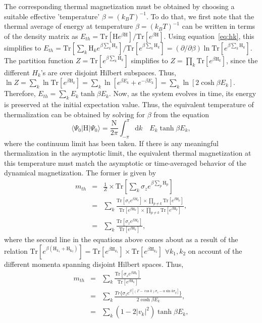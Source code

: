 \documentclass[a4paper,10pt]{article}
\begin{document}
The corresponding thermal magnetization must be obtained by choosing a suitable effective 'temperature' $\beta=(k_BT)^{-1}$. To do that, we first note that the thermal average of energy at temperature $\beta=(k_BT)^{-1}$ can be written in terms of the density matrix as $E_{th}=\mbox{Tr}[\mathrm{H} e^{\beta \mathrm{H}}]/\mbox{Tr}[e^{\beta \mathrm{H}}]$. Using equation~\ref{eq:hk}, this simplifies to $E_{th}=\mbox{Tr}[\sum_k \mathrm{H}_k e^{\beta \sum_k\mathrm{H}_k}]/\mbox{Tr}[e^{\beta \sum_k \mathrm{H}_k}]=(\partial/\partial\beta) \ln{\mbox{Tr}[e^{\beta \sum_k \mathrm{H}_k}]}$. The partition function $Z=\mbox{Tr}[e^{\beta \sum_k \mathrm{H}_k}]$ simplifies to $Z=\prod_k \mbox{Tr}[e^{\beta \mathrm{H}_k}]$, since the different $H_k$'s are over disjoint Hilbert subspaces. Thus, $\ln{Z}=\sum_k \ln{\mbox{Tr}[e^{\beta \mathrm{H}_k}]}=\sum_k\ln{[e^{\beta E_k}+e^{-\beta E_k}]}=\sum_k \ln{[2 \cosh{\beta E_k}]}$. Therefore, $E_{th}=\sum_k E_k \tanh{\beta E_k}$. Now, as the system evolves in time, its energy is preserved 
at the initial expectation value. Thus, the equivalent temperature of thermalization can be obtained by solving for $\beta$ from the equation
\begin{equation}
\label{eq:tempsolve}
\langle\Psi_0|\mathrm{H}|\Psi_0\rangle = \frac{\mathrm{N}}{2\pi}\int^{\pi}_{-\pi}\mathrm{d}k \quad E_k \tanh{\beta E_k},
\end{equation}
where the continuum limit has been taken. If there is any meaningful thermalization in the asymptotic limit, the equivalent thermal magnetization at this temperature must match the asymptotic or time-averaged behavior of the dynamical magnetization. The former is given by 
\begin{eqnarray}
 m_{th}&=& \frac{1}{Z}\times \mbox{Tr}[\sum_k\sigma_z e^{\beta \sum_p\mathrm{H}_p}]\nonumber \\
       &=& \sum_k \frac{\mbox{Tr}[\sigma_z e^{\beta H_k}]\times \prod_{p\neq k}\mbox{Tr}[e^{\beta \mathrm{H}_p}]}{\mbox{Tr}[e^{\beta \mathrm{H}_k}]\times\prod_{p\neq k}\mbox{Tr}[e^{\beta \mathrm{H}_p}]},\nonumber \\
       &=& \sum_k \frac{\mbox{Tr}[\sigma_z e^{\beta H_k}]}{\mbox{Tr}[e^{\beta \mathrm{H}_k}]},
\end{eqnarray}
where the second line in the equations above comes about as a result of the relation $\mbox{Tr}[e^{\beta (\mathrm{H}_{k_1}+\mathrm{H_{k_2}})}]=\mbox{Tr}[e^{\beta \mathrm{H}_{k_1}}]\times \mbox{Tr}[e^{\beta \mathrm{H}_{k_2}}]$ $\forall k_1, k_2$ on account of the different momenta spanning disjoint Hilbert spaces. Thus,
\begin{eqnarray}
\label{eq:mth}
 m_{th}&=& \sum_k \frac{\mbox{Tr}[\sigma_z e^{\beta H_k}]}{\mbox{Tr}[e^{\beta \mathrm{H}_k}]}\nonumber \\
       &=& \sum_k \frac{Tr\bigg\{\sigma_z e^{\beta\left[\left(\Gamma-\cos{k}\right)\sigma_z-\alpha\sin{k}\sigma_y\right]}\bigg\}}{2\cosh{\beta E_k}},\nonumber \\
       &=& \sum_k \left(1-2|v_k|^2\right)\tanh{\beta E_k},
\end{eqnarray}
\end{document}
